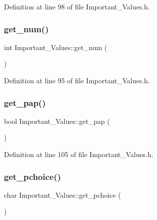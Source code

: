 Definition at line 98 of file Important\+\_\+\+Values.\+h.

\mbox{\label{class_important___values_a0979b7093620c12cf65f1b7d8027060d}} 
\subsubsection{\texorpdfstring{get\_num()}{get\_num()}}
{\footnotesize\ttfamily int Important\+\_\+\+Values\+::get\+\_\+num (\begin{DoxyParamCaption}{ }\end{DoxyParamCaption})\hspace{0.3cm}{\ttfamily [inline]}}



Definition at line 95 of file Important\+\_\+\+Values.\+h.

\mbox{\label{class_important___values_ad7195df82d97845f40907758a768293f}} 
\subsubsection{\texorpdfstring{get\_pap()}{get\_pap()}}
{\footnotesize\ttfamily bool Important\+\_\+\+Values\+::get\+\_\+pap (\begin{DoxyParamCaption}{ }\end{DoxyParamCaption})\hspace{0.3cm}{\ttfamily [inline]}}



Definition at line 105 of file Important\+\_\+\+Values.\+h.

\mbox{\label{class_important___values_afcf3350865b850cfe15a0c0cc7105f14}} 
\subsubsection{\texorpdfstring{get\_pchoice()}{get\_pchoice()}}
{\footnotesize\ttfamily char Important\+\_\+\+Values\+::get\+\_\+pchoice (\begin{DoxyParamCaption}{ }\end{DoxyParamCaption})\hspace{0.3cm}{\ttfamily [inline]}}



